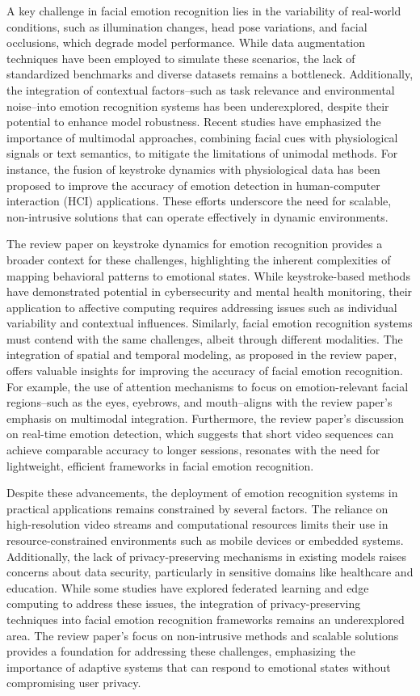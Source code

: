 \documentclass[conference]{IEEEtran}
\begin{document}
A key challenge in facial emotion recognition lies in the variability of real-world conditions, such as illumination changes, head pose variations, and facial occlusions, which degrade model performance. While data augmentation techniques have been employed to simulate these scenarios, the lack of standardized benchmarks and diverse datasets remains a bottleneck. Additionally, the integration of contextual factors--such as task relevance and environmental noise--into emotion recognition systems has been underexplored, despite their potential to enhance model robustness. Recent studies have emphasized the importance of multimodal approaches, combining facial cues with physiological signals or text semantics, to mitigate the limitations of unimodal methods. For instance, the fusion of keystroke dynamics with physiological data has been proposed to improve the accuracy of emotion detection in human-computer interaction (HCI) applications. These efforts underscore the need for scalable, non-intrusive solutions that can operate effectively in dynamic environments.  

The review paper on keystroke dynamics for emotion recognition provides a broader context for these challenges, highlighting the inherent complexities of mapping behavioral patterns to emotional states. While keystroke-based methods have demonstrated potential in cybersecurity and mental health monitoring, their application to affective computing requires addressing issues such as individual variability and contextual influences. Similarly, facial emotion recognition systems must contend with the same challenges, albeit through different modalities. The integration of spatial and temporal modeling, as proposed in the review paper, offers valuable insights for improving the accuracy of facial emotion recognition. For example, the use of attention mechanisms to focus on emotion-relevant facial regions--such as the eyes, eyebrows, and mouth--aligns with the review paper's emphasis on multimodal integration. Furthermore, the review paper's discussion on real-time emotion detection, which suggests that short video sequences can achieve comparable accuracy to longer sessions, resonates with the need for lightweight, efficient frameworks in facial emotion recognition.  

Despite these advancements, the deployment of emotion recognition systems in practical applications remains constrained by several factors. The reliance on high-resolution video streams and computational resources limits their use in resource-constrained environments such as mobile devices or embedded systems. Additionally, the lack of privacy-preserving mechanisms in existing models raises concerns about data security, particularly in sensitive domains like healthcare and education. While some studies have explored federated learning and edge computing to address these issues, the integration of privacy-preserving techniques into facial emotion recognition frameworks remains an underexplored area. The review paper's focus on non-intrusive methods and scalable solutions provides a foundation for addressing these challenges, emphasizing the importance of adaptive systems that can respond to emotional states without compromising user privacy.  
\end{document}
